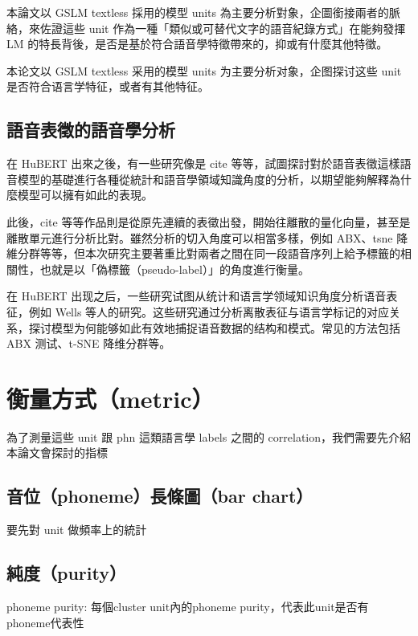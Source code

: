 本論文以 GSLM textless 採用的模型 units 為主要分析對象，企圖銜接兩者的脈絡，來佐證這些 unit 作為一種「類似或可替代文字的語音紀錄方式」在能夠發揮 LM 的特長背後，是否是基於符合語音學特徵帶來的，抑或有什麼其他特徵。

本论文以 GSLM textless 采用的模型 units 为主要分析对象，企图探讨这些 unit 是否符合语言学特征，或者有其他特征。



\subsection{語音表徵的語音學分析}
在 HuBERT 出來之後，有一些研究像是 cite 等等，試圖探討對於語音表徵這樣語音模型的基礎進行各種從統計和語音學領域知識角度的分析，以期望能夠解釋為什麼模型可以擁有如此的表現。

此後，cite 等等作品則是從原先連續的表徵出發，開始往離散的量化向量，甚至是離散單元進行分析比對。雖然分析的切入角度可以相當多樣，例如 ABX、tsne 降維分群等等，但本次研究主要著重比對兩者之間在同一段語音序列上給予標籤的相關性，也就是以「偽標籤（pseudo-label）」的角度進行衡量。


在 HuBERT 出现之后，一些研究试图从统计和语言学领域知识角度分析语音表征，例如 Wells 等人的研究。这些研究通过分析离散表征与语言学标记的对应关系，探讨模型为何能够如此有效地捕捉语音数据的结构和模式。常见的方法包括 ABX 测试、t-SNE 降维分群等。



 
\section{衡量方式（metric）}

為了測量這些 unit 跟 phn 這類語言學 labels 之間的 correlation，我們需要先介紹本論文會探討的指標

\subsection{音位（phoneme）長條圖（bar chart）}

要先對 unit 做頻率上的統計

\subsection{純度（purity）}


phoneme purity: 每個cluster unit內的phoneme purity，代表此unit是否有phoneme代表性

\newcommand{\E}{\mathbb{E}}

